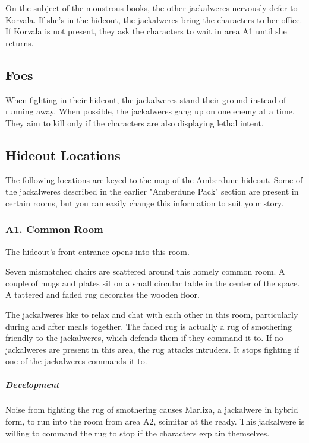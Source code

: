 \documentclass[10pt,a4paper,twoside,bg=print,twocolumn,openany,nodeprecatedcode]{dndbook}
\begin{document}
On the subject of the monstrous books, the other jackalweres nervously defer to Korvala. If she's in the hideout, the jackalweres bring the characters to her office. If Korvala is not present, they ask the characters to wait in area A1 until she returns.

\subsection{Foes}
When fighting in their hideout, the jackalweres stand their ground instead of running away. When possible, the jackalweres gang up on one enemy at a time. They aim to kill only if the characters are also displaying lethal intent.

\subsection{Hideout Locations}
The following locations are keyed to the map of the Amberdune hideout. Some of the jackalweres described in the earlier "Amberdune Pack" section are present in certain rooms, but you can easily change this information to suit your story.

\subsubsection{A1. Common Room}
The hideout's front entrance opens into this room.

\begin{DndReadAloud}{}
Seven mismatched chairs are scattered around this homely common room. A couple of mugs and plates sit on a small circular table in the center of the space. A tattered and faded rug decorates the wooden floor. 

\end{DndReadAloud}

The jackalweres like to relax and chat with each other in this room, particularly during and after meals together. The faded rug is actually a rug of smothering friendly to the jackalweres, which defends them if they command it to. If no jackalweres are present in this area, the rug attacks intruders. It stops fighting if one of the jackalweres commands it to.

\subparagraph{Development}
Noise from fighting the rug of smothering causes Marliza, a jackalwere in hybrid form, to run into the room from area A2, scimitar at the ready. This jackalwere is willing to command the rug to stop if the characters explain themselves.
\end{document}
